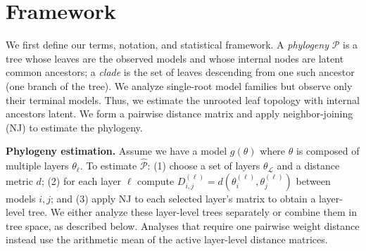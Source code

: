 \documentclass{article}
\theoremstyle{definition}
\theoremstyle{plain}
\begin{document}


\section{Framework}
\label{sec:framework}

We first define our terms, notation, and statistical framework. A \emph{phylogeny} $\mathcal{P}$ is a tree
whose leaves are the observed models and whose internal nodes are latent common ancestors; a
\emph{clade} is the set of leaves descending from one such ancestor (one branch of the tree). We analyze
single-root model families but observe only their terminal models. Thus,  we estimate the unrooted leaf topology with internal ancestors latent. We form a pairwise distance matrix and apply neighbor-joining (NJ)
\citep{saitou1987neighbor} to estimate the phylogeny.

\textbf{Phylogeny estimation.}\label{sec:framework:phylo}
Assume we have a model $g(\theta)$ where $\theta$ is composed of multiple layers $\theta_\ell$. To estimate $\widehat{\mathcal{P}}$: (1) choose a set of layers $\theta_\mathcal{L}$ and a distance metric $d$;
(2) for each layer $\ell$ compute $D_{i,j}^{(\ell)} = d(\theta^{(\ell)}_i, \theta^{(\ell)}_j)$ between models
$i,j$; and (3) apply NJ to each selected layer's matrix to obtain a layer-level tree. We either
analyze these layer-level trees separately or combine them in tree space, as described below. Analyses
that require one pairwise weight distance instead use the arithmetic mean of the active layer-level
distance matrices.
\end{document}

